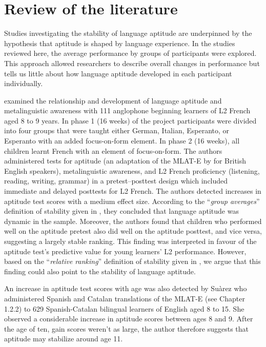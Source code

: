 \documentclass[output=paper]{langsci/langscibook}
\begin{document}
\section{Review of the literature} 

Studies investigating the stability of language aptitude are underpinned by the hypothesis that aptitude is shaped by language experience. In the studies reviewed here, the average performance by groups of participants were explored. This approach allowed researchers to describe overall changes in performance but tells us little about how language aptitude developed in each participant individually. 

\citet{RoehrBrackinTellier2019} examined the relationship and development of language aptitude and metalinguistic awareness with 111 anglophone beginning learners of L2 French aged 8 to 9 years. In phase 1 (16 weeks) of the project participants were divided into four groups that were taught either German, Italian, Esperanto, or Esperanto with an added focus-on-form element. In phase 2 (16 weeks), all children learnt French with an element of focus-on-form. The authors administered tests for aptitude (an adaptation of the MLAT-E by \citet{CarrollSapon1976} for British English speakers), metalinguistic awareness, and L2 French proficiency (listening, reading, writing, grammar) in a pretest--posttest design which included immediate and delayed posttests for L2 French. The authors detected increases in aptitude test scores with a medium effect size. According to the “\textit{group averages}” definition of stability given in , they concluded that language aptitude was dynamic in the sample. Moreover, the authors found that children who performed well on the aptitude pretest also did well on the aptitude posttest, and vice versa, suggesting a largely stable ranking. This finding was interpreted in favour of the aptitude test’s predictive value for young learners’ L2 performance. However, based on the “\textit{relative ranking}” definition of stability given in , we argue that this finding could also point to the stability of language aptitude.

An increase in aptitude test scores with age was also detected by Suàrez  who administered Spanish and Catalan translations of the MLAT-E (see Chapter 1.2.2) to 629 Spanish-Catalan bilingual learners of English aged 8 to 15. She observed a considerable increase in aptitude scores between ages 8 and 9. After the age of ten, gain scores weren’t as large, the author therefore suggests that aptitude may stabilize around age 11.
\end{document}
